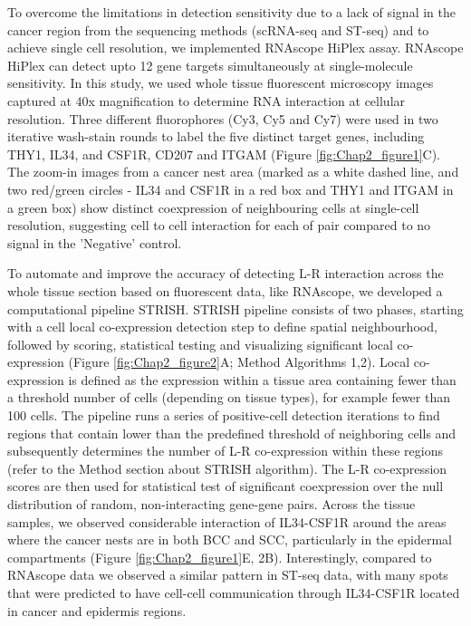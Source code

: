 To overcome the limitations in detection sensitivity due to a lack of signal in the cancer region from the sequencing methods (scRNA-seq and ST-seq) and to achieve single cell resolution, we implemented RNAscope HiPlex assay. RNAscope HiPlex can detect upto 12 gene targets simultaneously at single-molecule sensitivity. In this study, we used whole tissue fluorescent microscopy images captured at 40x magnification to determine RNA interaction at cellular resolution. Three different fluorophores (Cy3, Cy5 and Cy7) were used in two iterative wash-stain rounds to label the five distinct target genes, including THY1, IL34, and CSF1R, CD207 and ITGAM (Figure \ref{fig:Chap2_figure1}C). The zoom-in images from a cancer nest area (marked as a white dashed line, and two red/green circles - IL34 and CSF1R in a red box and THY1 and ITGAM in a green box) show distinct coexpression of neighbouring cells at single-cell resolution, suggesting cell to cell interaction for each of pair compared to no signal in the 'Negative' control. 

To automate and improve the accuracy of detecting L-R interaction across the whole tissue section based on fluorescent data, like RNAscope, we developed a computational pipeline STRISH. STRISH pipeline consists of two phases, starting with a cell local co-expression detection step to define spatial neighbourhood, followed by scoring, statistical testing and visualizing significant local co-expression (Figure \ref{fig:Chap2_figure2}A; Method Algorithms 1,2). Local co-expression is defined as the expression within a tissue area containing fewer than a threshold number of cells (depending on tissue types), for example fewer than 100 cells. The pipeline runs a series of positive-cell detection iterations to find regions that contain lower than the predefined threshold of neighboring cells and subsequently determines the number of L-R co-expression within these regions (refer to the Method section about STRISH algorithm). The L-R co-expression scores are then used for statistical test of significant coexpression over the null distribution of random, non-interacting gene-gene pairs. Across the tissue samples, we observed considerable interaction of IL34-CSF1R around the areas where the cancer nests are in both BCC and SCC, particularly in the epidermal compartments (Figure \ref{fig:Chap2_figure1}E, 2B). Interestingly, compared to RNAscope data we observed a similar pattern in ST-seq data, with many spots that were predicted to have cell-cell communication through IL34-CSF1R located in cancer and epidermis regions.  


